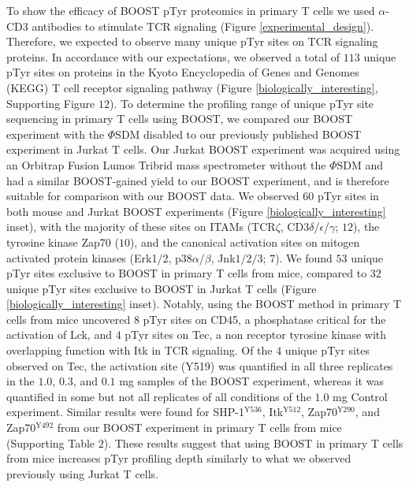 \documentclass[journal=jprobs,manuscript=article]{achemso}
\begin{document}
To show the efficacy of BOOST pTyr proteomics in primary T cells we used $\alpha$-CD3 antibodies to stimulate TCR signaling (Figure \ref{experimental_design}). Therefore, we expected to observe many unique pTyr sites on TCR signaling proteins. In accordance with our expectations, we observed a total of $113$ unique pTyr sites on proteins in the Kyoto Encyclopedia of Genes and Genomes (KEGG) T cell receptor signaling pathway (Figure \ref{biologically_interesting}, Supporting Figure $12$). To determine the profiling range of unique pTyr site sequencing in primary T cells using BOOST, we compared our BOOST experiment with the $\Phi$SDM disabled to our previously published BOOST experiment in Jurkat T cells\cite{chua2020tandem}. Our Jurkat BOOST experiment was acquired using an Orbitrap Fusion Lumos Tribrid mass spectrometer without the $\Phi$SDM and had a similar BOOST-gained yield to our BOOST experiment\cite{yu2020benchmarking,chua2020tandem}, and is therefore suitable for comparison with our BOOST data. We observed $60$ pTyr sites in both mouse and Jurkat BOOST experiments (Figure \ref{biologically_interesting} inset), with the majority of these sites on ITAMs (TCR$\zeta$, CD3$\delta$/$\epsilon$/$\gamma$; $12$), the tyrosine kinase Zap70 ($10$), and the canonical activation sites on mitogen activated protein kinases (Erk1/2, p38$\alpha$/$\beta$, Jnk$1/2/3$; $7$). We found $53$ unique pTyr sites exclusive to BOOST in primary T cells from mice, compared to $32$ unique pTyr sites exclusive to BOOST in Jurkat T cells (Figure \ref{biologically_interesting} inset). Notably, using the BOOST method in primary T cells from mice uncovered $8$ pTyr sites on CD45, a phosphatase critical for the activation of Lck\cite{sieh1993cd45}, and $4$ pTyr sites on Tec, a non receptor tyrosine kinase with overlapping function with Itk in TCR signaling\cite{yang1999role,aoki2004mutual}. Of the $4$ unique pTyr sites observed on Tec, the activation site (Y519) was quantified in all three replicates in the $1.0$, $0.3$, and $0.1$ mg samples of the BOOST experiment, whereas it was quantified in some but not all replicates of all conditions of the $1.0$ mg Control experiment. Similar results were found for SHP-1$^{\text{Y536}}$, Itk$^{\text{Y512}}$, Zap70$^{\text{Y290}}$, and Zap70$^{\text{Y492}}$ from our BOOST experiment in primary T cells from mice (Supporting Table $2$). These results suggest that using BOOST in primary T cells from mice increases pTyr profiling depth similarly to what we observed previously using Jurkat T cells\cite{chua2020tandem,chua2021ovalbumin}.
\end{document}
